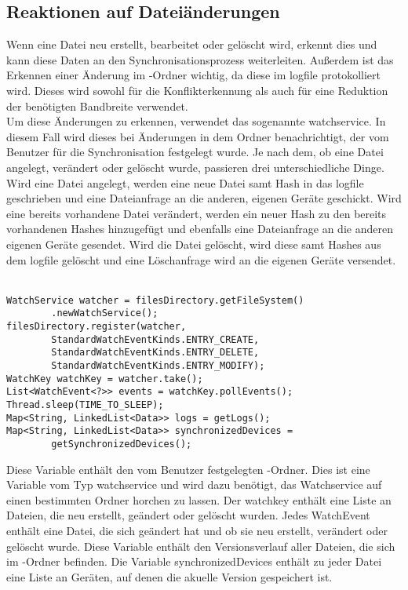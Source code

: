 \subsection{Reaktionen auf Dateiänderungen}
Wenn eine Datei neu erstellt, bearbeitet oder gelöscht wird, erkennt dies \sblit und kann diese Daten an den Synchronisationsprozess weiterleiten. Außerdem ist das Erkennen einer Änderung im \sblit-Ordner wichtig, da diese im \gls{logfile} protokolliert wird. Dieses wird sowohl für die Konflikterkennung  als auch für eine Reduktion der benötigten Bandbreite  verwendet.\\
Um diese Änderungen zu erkennen, verwendet \sblit das sogenannte \gls{watchservice}. In diesem Fall wird dieses bei Änderungen in dem Ordner benachrichtigt, der vom Benutzer für die Synchronisation festgelegt wurde. Je nach dem, ob eine Datei angelegt, verändert oder gelöscht wurde, passieren drei unterschiedliche Dinge. Wird eine Datei angelegt, werden eine neue Datei samt Hash in das \gls{logfile} geschrieben und eine Dateianfrage an die anderen, eigenen Geräte geschickt. Wird eine bereits vorhandene Datei verändert, werden ein neuer Hash zu den bereits vorhandenen Hashes hinzugefügt und ebenfalls eine Dateianfrage an die anderen eigenen Geräte gesendet. Wird die Datei gelöscht, wird diese samt Hashes aus dem \gls{logfile} gelöscht und eine Löschanfrage wird an die eigenen Geräte versendet.\\ \\
\javalisting
\begin{minipage}{\linewidth}
\begin{lstlisting}[caption={Initialisierung des \gls{watchservice}},captionpos=b]
WatchService watcher = filesDirectory.getFileSystem()
		.newWatchService();
filesDirectory.register(watcher,
		StandardWatchEventKinds.ENTRY_CREATE,
		StandardWatchEventKinds.ENTRY_DELETE,
		StandardWatchEventKinds.ENTRY_MODIFY);
WatchKey watchKey = watcher.take();
List<WatchEvent<?>> events = watchKey.pollEvents();
Thread.sleep(TIME_TO_SLEEP);
Map<String, LinkedList<Data>> logs = getLogs();
Map<String, LinkedList<Data>> synchronizedDevices = 
		getSynchronizedDevices();
\end{lstlisting}
\end{minipage}
\begin{description}
	Diese Variable enthält den vom Benutzer festgelegten \sblit-Ordner.
	Dies ist eine Variable vom Typ \gls{watchservice} und wird dazu benötigt, das Watchservice auf einen bestimmten Ordner horchen zu lassen.
	Der \gls{watchkey} enthält eine Liste an Dateien, die neu erstellt, geändert oder gelöscht wurden.
	Jedes WatchEvent enthält eine Datei, die sich geändert hat und ob sie neu erstellt, verändert oder gelöscht wurde. 
	Diese Variable enthält den Versionsverlauf aller Dateien, die sich im \sblit-Ordner befinden.
	Die Variable synchronizedDevices enthält zu jeder Datei eine Liste an Geräten, auf denen die akuelle Version gespeichert ist.
\end{description}
